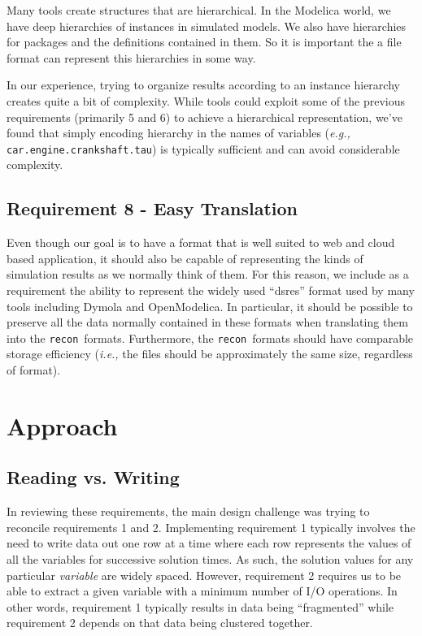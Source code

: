 \documentclass[11pt,a4paper,twocolumn]{article}
\newcommand{\recon}{\texttt{recon}}
\newcommand{\code}[1]{\texttt{#1}} %
\begin{document}

Many tools create structures that are hierarchical.  In the Modelica
world, we have deep hierarchies of instances in simulated models.  We
also have hierarchies for packages and the definitions contained in
them.  So it is important the a file format can represent this
hierarchies in some way.

In our experience, trying to organize results according to an instance
hierarchy creates quite a bit of complexity.  While tools could
exploit some of the previous requirements (primarily 5 and 6) to
achieve a hierarchical representation, we've found that simply
encoding hierarchy in the names of variables (\textit{e.g.,}
\code{car.engine.crankshaft.tau}) is typically sufficient and can
avoid considerable complexity.

\subsection{Requirement 8 - Easy Translation}


Even though our goal is to have a format that is well suited to web
and cloud based application, it should also be capable of representing
the kinds of simulation results as we normally think of them.  For
this reason, we include as a requirement the ability to represent the
widely used ``dsres'' format used by many tools including Dymola and
OpenModelica.  In particular, it should be possible to preserve all
the data normally contained in these formats when translating them
into the \recon\ formats.  Furthermore, the \recon\ formats should have
comparable storage efficiency (\textit{i.e.,} the files should be
approximately the same size, regardless of format).

\section{Approach}

\subsection{Reading vs. Writing}

In reviewing these requirements, the main design challenge was trying
to reconcile requirements 1 and 2.  Implementing requirement 1
typically involves the need to write data out one row at a time where
each row represents the values of all the variables for successive
solution times.  As such, the solution values for any particular
\textit{variable} are widely spaced.  However, requirement 2 requires
us to be able to extract a given variable with a minimum number of I/O
operations.  In other words, requirement 1 typically results in data
being ``fragmented'' while requirement 2 depends on that data being
clustered together.
\end{document}
